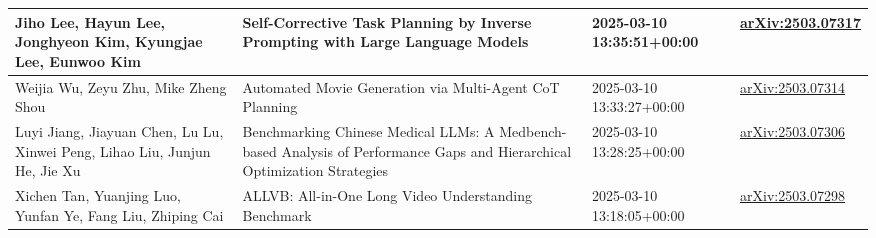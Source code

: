 \documentclass{article}
\newlength\autolength
\begin{document}
\begin{longtable}{|P{\autolength}|P{\autolength}|P{\autolength}|P{\autolength}|}
Jiho Lee, Hayun Lee, Jonghyeon Kim, Kyungjae Lee, Eunwoo Kim & Self-Corrective Task Planning by Inverse Prompting with Large Language Models & 2025-03-10 13:35:51+00:00 & \href{http://arxiv.org/abs/2503.07317v1}{arXiv:2503.07317} \\ \hline
Weijia Wu, Zeyu Zhu, Mike Zheng Shou & Automated Movie Generation via Multi-Agent CoT Planning & 2025-03-10 13:33:27+00:00 & \href{http://arxiv.org/abs/2503.07314v1}{arXiv:2503.07314} \\ \hline
Luyi Jiang, Jiayuan Chen, Lu Lu, Xinwei Peng, Lihao Liu, Junjun He, Jie Xu & Benchmarking Chinese Medical LLMs: A Medbench-based Analysis of Performance Gaps and Hierarchical Optimization Strategies & 2025-03-10 13:28:25+00:00 & \href{http://arxiv.org/abs/2503.07306v1}{arXiv:2503.07306} \\ \hline
Xichen Tan, Yuanjing Luo, Yunfan Ye, Fang Liu, Zhiping Cai & ALLVB: All-in-One Long Video Understanding Benchmark & 2025-03-10 13:18:05+00:00 & \href{http://arxiv.org/abs/2503.07298v1}{arXiv:2503.07298} \\ \hline
\end{longtable}
\end{document}
